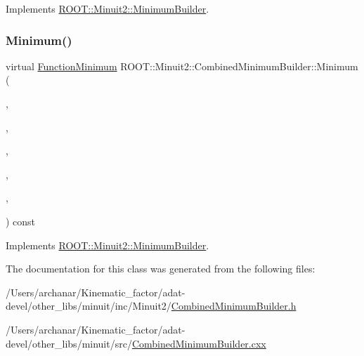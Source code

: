 Implements \mbox{\hyperlink{classROOT_1_1Minuit2_1_1MinimumBuilder_aefaa624436afa8195af1f3393a35981f}{R\+O\+O\+T\+::\+Minuit2\+::\+Minimum\+Builder}}.

\mbox{\label{classROOT_1_1Minuit2_1_1CombinedMinimumBuilder_a5439a04b01ff94a8f790443b867d6e53}} 
\subsubsection{\texorpdfstring{Minimum()}{Minimum()}\hspace{0.1cm}{\footnotesize\ttfamily [3/3]}}
{\footnotesize\ttfamily virtual \mbox{\hyperlink{classROOT_1_1Minuit2_1_1FunctionMinimum}{Function\+Minimum}} R\+O\+O\+T\+::\+Minuit2\+::\+Combined\+Minimum\+Builder\+::\+Minimum (\begin{DoxyParamCaption}\item[{const \mbox{\hyperlink{classROOT_1_1Minuit2_1_1MnFcn}{Mn\+Fcn}} \&}]{,  }\item[{const \mbox{\hyperlink{classROOT_1_1Minuit2_1_1GradientCalculator}{Gradient\+Calculator}} \&}]{,  }\item[{const \mbox{\hyperlink{classROOT_1_1Minuit2_1_1MinimumSeed}{Minimum\+Seed}} \&}]{,  }\item[{const \mbox{\hyperlink{classROOT_1_1Minuit2_1_1MnStrategy}{Mn\+Strategy}} \&}]{,  }\item[{unsigned int}]{,  }\item[{double}]{ }\end{DoxyParamCaption}) const\hspace{0.3cm}{\ttfamily [virtual]}}



Implements \mbox{\hyperlink{classROOT_1_1Minuit2_1_1MinimumBuilder_aefaa624436afa8195af1f3393a35981f}{R\+O\+O\+T\+::\+Minuit2\+::\+Minimum\+Builder}}.



The documentation for this class was generated from the following files\+:\begin{DoxyCompactItemize}
\item 
/\+Users/archanar/\+Kinematic\+\_\+factor/adat-\/devel/other\+\_\+libs/minuit/inc/\+Minuit2/\mbox{\hyperlink{adat-devel_2other__libs_2minuit_2inc_2Minuit2_2CombinedMinimumBuilder_8h}{Combined\+Minimum\+Builder.\+h}}\item 
/\+Users/archanar/\+Kinematic\+\_\+factor/adat-\/devel/other\+\_\+libs/minuit/src/\mbox{\hyperlink{adat-devel_2other__libs_2minuit_2src_2CombinedMinimumBuilder_8cxx}{Combined\+Minimum\+Builder.\+cxx}}\end{DoxyCompactItemize}
